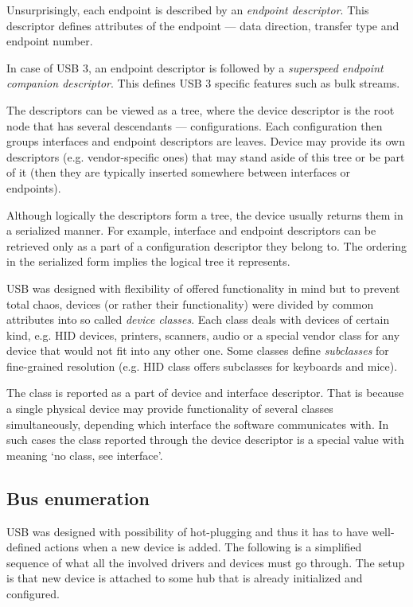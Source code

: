 Unsurprisingly, each endpoint is described by an \textit{endpoint descriptor}.
This descriptor defines attributes of the endpoint — data direction, transfer
type and endpoint number.

In case of USB 3, an endpoint descriptor is followed by a \textit{superspeed
endpoint companion descriptor}. This defines USB 3 specific features such as
bulk streams.

The descriptors can be viewed as a tree, where the device descriptor is the
root node that has several descendants — configurations. Each configuration
then groups interfaces and endpoint descriptors are leaves. Device may provide
its own descriptors (e.g. vendor-specific ones) that may stand aside of this
tree or be part of it (then they are typically inserted somewhere between
interfaces or endpoints).

Although logically the descriptors form a tree, the device usually returns them
in a serialized manner. For example, interface and endpoint descriptors can be
retrieved only as a part of a configuration descriptor they belong to. The
ordering in the serialized form implies the logical tree it represents.

USB was designed with flexibility of offered functionality in mind but to
prevent total chaos, devices (or rather their functionality) were divided by
common attributes into so called \textit{device classes}. Each class deals with
devices of certain kind, e.g. HID devices, printers, scanners, audio or a
special vendor class for any device that would not fit into any other one. Some
classes define \textit{subclasses} for fine-grained resolution (e.g. HID class
offers subclasses for keyboards and mice).

The class is reported as a part of device and interface descriptor. That is
because a single physical device may provide functionality of several classes
simultaneously, depending which interface the software communicates with. In
such cases the class reported through the device descriptor is a special value
with meaning ‘no class, see interface’.

\subsection{Bus enumeration}

USB was designed with possibility of hot-plugging and thus it has to have
well-defined actions when a new device is added. The following is a simplified
sequence of what all the involved drivers and devices must go through. The
setup is that new device is attached to some hub that is already initialized
and configured.

